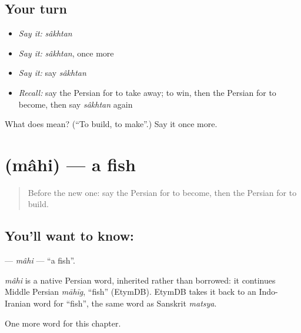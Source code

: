 \subsection*{Your turn}
\begin{itemize}
\raggedright
  \item \emph{Say it:} \emph{sâkhtan}
  \item \emph{Say it:} \emph{sâkhtan}, once more
  \item \emph{Say it:} say \emph{sâkhtan}
  \item \emph{Recall:} say the Persian for to take away; to win, then the Persian for to become, then say \emph{sâkhtan} again
\end{itemize}

\begin{tcolorbox}[breakable,colback=teal!4,colframe=teal!35!black,title={Before you move on}]
What does  mean? (\textquotedblleft{}To build, to make\textquotedblright{}.) Say it once more.
\end{tcolorbox}
\section[\texorpdfstring{\fa{ماهی} (mâhi)}{ماهی (mâhi)}]{ (mâhi) — a fish}

\label{lesson:FA-C40-mahi}



\begin{quote}
Before the new one: say the Persian for to become, then the Persian for to build.
\end{quote}

\subsection*{You'll want to know: }
\textbf{} — \emph{mâhi} — \textquotedblleft{}a fish\textquotedblright{}.

\begin{cousinweb}
\emph{mâhi} is a native Persian word, inherited rather than borrowed: it continues Middle Persian \emph{māhīg}, \textquotedblleft{}fish\textquotedblright{} (EtymDB). EtymDB takes it back to an Indo-Iranian word for \textquotedblleft{}fish\textquotedblright{}, the same word as Sanskrit \emph{matsya}.
\end{cousinweb}

\begin{grammarlens}[title={What you've built}]
One more word for this chapter.
\end{grammarlens}

